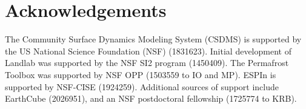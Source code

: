 \documentclass{article} %
\begin{document}
\section{Acknowledgements}

The Community Surface Dynamics Modeling System (CSDMS) is supported by the US National Science Foundation (NSF) (1831623). Initial development of Landlab was supported by the NSF SI2 program (1450409). The Permafrost Toolbox was supported by NSF OPP (1503559 to IO and MP). ESPIn is supported by NSF-CISE (1924259). Additional sources of support include EarthCube (2026951), and an NSF postdoctoral fellowship (1725774 to KRB).




\end{document}
